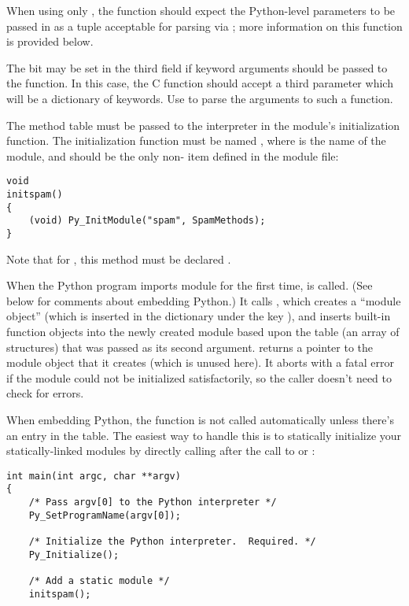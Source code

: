 \documentclass{manual}
\begin{document}
When using only , the function should expect
the Python-level parameters to be passed in as a tuple acceptable for
parsing via ; more information on this
function is provided below.

The  bit may be set in the third field if
keyword arguments should be passed to the function.  In this case, the
C function should accept a third  parameter which
will be a dictionary of keywords.  Use
 to parse the arguments to
such a function.

The method table must be passed to the interpreter in the module's
initialization function.  The initialization function must be named
, where  is the name of the
module, and should be the only non- item defined in
the module file:

\begin{verbatim}
void
initspam()
{
    (void) Py_InitModule("spam", SpamMethods);
}
\end{verbatim}

Note that for \Cpp, this method must be declared .

When the Python program imports module  for the first
time,  is called. (See below for comments about
embedding Python.)  It calls
, which creates a ``module object'' (which
is inserted in the dictionary  under the key
), and inserts built-in function objects into the newly
created module based upon the table (an array of 
structures) that was passed as its second argument.
 returns a pointer to the module object
that it creates (which is unused here).  It aborts with a fatal error
if the module could not be initialized satisfactorily, so the caller
doesn't need to check for errors.

When embedding Python, the  function is not
called automatically unless there's an entry in the
 table.  The easiest way to handle this is to 
statically initialize your statically-linked modules by directly
calling  after the call to
 or :

\begin{verbatim}
int main(int argc, char **argv)
{
    /* Pass argv[0] to the Python interpreter */
    Py_SetProgramName(argv[0]);

    /* Initialize the Python interpreter.  Required. */
    Py_Initialize();

    /* Add a static module */
    initspam();
\end{verbatim}
\end{document}
